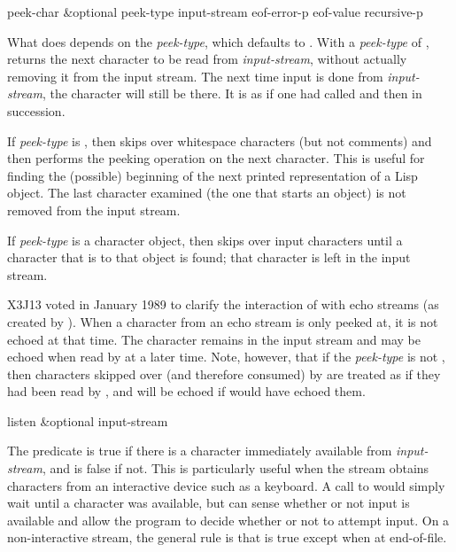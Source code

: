 \newpage%

\begin{defun}[Function]
peek-char &optional peek-type input-stream eof-error-p eof-value recursive-p

What  does depends on the {\it peek-type}, which
defaults to {\false}.  With a {\it peek-type} of {\false},
 returns the next character to be read from 
{\it input-stream}, without actually removing it from the input stream.
The next time input is done from {\it input-stream}, the character will still
be there.  It is as if one had called  and then 
in succession.

If {\it peek-type} is {\true}, then  skips over whitespace
characters (but not comments)
and then performs the peeking operation on the next
character.
This is useful for finding the (possible) beginning
of the next printed representation of a Lisp object.
The last character examined (the one that starts an object)
is not removed from the input stream.

If {\it peek-type} is a character object, then  skips
over input characters until a character that
is  to that object is found;
that character is left in the input stream.

\begin{new}
X3J13 voted in January 1989
to clarify the interaction of  with echo streams
(as created by ).  When a character from an echo
stream is only peeked at, it is not echoed at that time.  The character remains in
the input stream and may be echoed when read by  at a later time.
Note, however, that if the {\it peek-type} is not , then characters
skipped over (and therefore consumed) by  are treated as if they had been read
by , and will be echoed if  would have echoed them.
\end{new}
\end{defun}

\begin{defun}[Function]
listen &optional input-stream

The predicate  is true if there is a character
immediately available from {\it input-stream}, and is false if not.
This is particularly useful when the stream obtains characters
from an interactive device such as a keyboard.  A call to 
would simply wait until a character was available, but  can
sense whether or not input is available and allow the program to
decide whether or not to attempt input.  On a non-interactive stream,
the general rule is that  is true except when at
end-of-file.
\end{defun}

